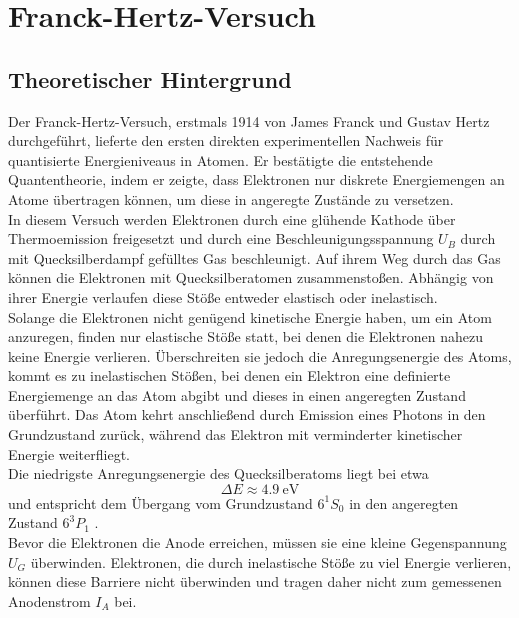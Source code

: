 \chapter{Franck-Hertz-Versuch}


\section{Theoretischer Hintergrund}
Der Franck-Hertz-Versuch, erstmals 1914 von James Franck und Gustav Hertz durchgeführt, lieferte den ersten direkten experimentellen Nachweis für quantisierte Energieniveaus in Atomen. Er bestätigte die entstehende Quantentheorie, indem er zeigte, dass Elektronen nur diskrete Energiemengen an Atome übertragen können, um diese in angeregte Zustände zu versetzen.
\vspace{0.3cm}\\
In diesem Versuch werden Elektronen durch eine glühende Kathode über Thermoemission freigesetzt und durch eine Beschleunigungsspannung $U_B$ durch mit Quecksilberdampf gefülltes Gas beschleunigt. Auf ihrem Weg durch das Gas können die Elektronen mit Quecksilberatomen zusammenstoßen. Abhängig von ihrer Energie verlaufen diese Stöße entweder elastisch oder inelastisch.
\vspace{0.3cm}\\
Solange die Elektronen nicht genügend kinetische Energie haben, um ein Atom anzuregen, finden nur elastische Stöße statt, bei denen die Elektronen nahezu keine Energie verlieren. Überschreiten sie jedoch die Anregungsenergie des Atoms, kommt es zu inelastischen Stößen, bei denen ein Elektron eine definierte Energiemenge an das Atom abgibt und dieses in einen angeregten Zustand überführt. Das Atom kehrt anschließend durch Emission eines Photons in den Grundzustand zurück, während das Elektron mit verminderter kinetischer Energie weiterfliegt.
\vspace{0.3cm}\\
Die niedrigste Anregungsenergie des Quecksilberatoms liegt bei etwa
\begin{equation}
\Delta E \approx \SI{4.9}{\electronvolt} 
\end{equation}
und entspricht dem Übergang vom Grundzustand $6^1S_0$ in den angeregten Zustand $6^3P_1$ \cite{hg_EE}.
\vspace{0.3cm}\\
Bevor die Elektronen die Anode erreichen, müssen sie eine kleine Gegenspannung $U_G$ überwinden. Elektronen, die durch inelastische Stöße zu viel Energie verlieren, können diese Barriere nicht überwinden und tragen daher nicht zum gemessenen Anodenstrom $I_A$ bei.
